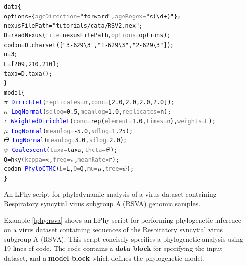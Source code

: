 \documentclass[12pt]{article} %
\begin{document}
{
  \small
  \begin{listing}
    \begin{alltt}
    data \{
      options = \{\textcolor{gray}{ageDirection=}\textcolor{constant}{"forward"}, \textcolor{gray}{ageRegex=}\textcolor{constant}{"s(\textbackslash{}d+)"}\};
      nexusFilePath = \textcolor{constant}{"tutorials/data/RSV2.nex"};
      D = \textcolor{generator}{readNexus}(\textcolor{gray}{file=}nexusFilePath, \textcolor{gray}{options=}options);
      codon = D.\textcolor{generator}{charset}([\textcolor{constant}{"3-629\textbackslash{}3"}, \textcolor{constant}{"1-629\textbackslash{}3"}, \textcolor{constant}{"2-629\textbackslash{}3"}]);
      n = 3;
      L = [209, 210, 210];
      taxa = D.\textcolor{generator}{taxa}();
    \}
    model \{
      \textcolor{bluishgreen}{\(\pi\)} ~ \textcolor{blue}{Dirichlet}(\textcolor{gray}{replicates=}n, \textcolor{gray}{conc=}[\textcolor{constant}{2.0}, \textcolor{constant}{2.0}, \textcolor{constant}{2.0}, \textcolor{constant}{2.0}]);
      \textcolor{bluishgreen}{\(\kappa\)} ~ \textcolor{blue}{LogNormal}(\textcolor{gray}{sdlog=}\textcolor{constant}{0.5}, \textcolor{gray}{meanlog=}\textcolor{constant}{1.0}, \textcolor{gray}{replicates=}n);
      \textcolor{bluishgreen}{r} ~ \textcolor{blue}{WeightedDirichlet}(\textcolor{gray}{conc=}\textcolor{generator}{rep}(\textcolor{gray}{element=}\textcolor{constant}{1.0}, \textcolor{gray}{times=}n), \textcolor{gray}{weights=}L);
      \textcolor{bluishgreen}{\(\mu\)} ~ \textcolor{blue}{LogNormal}(\textcolor{gray}{meanlog=}\textcolor{constant}{-5.0}, \textcolor{gray}{sdlog=}\textcolor{constant}{1.25});
      \textcolor{bluishgreen}{\(\Theta\)} ~ \textcolor{blue}{LogNormal}(\textcolor{gray}{meanlog=}\textcolor{constant}{3.0}, \textcolor{gray}{sdlog=}\textcolor{constant}{2.0});
      \textcolor{bluishgreen}{\(\psi\)} ~ \textcolor{blue}{Coalescent}(\textcolor{gray}{taxa=}taxa, \textcolor{gray}{theta=}\textcolor{bluishgreen}{\(\Theta\)});
      Q = \textcolor{generator}{hky}(\textcolor{gray}{kappa=}\textcolor{bluishgreen}{\(\kappa\)}, \textcolor{gray}{freq=}\textcolor{bluishgreen}{\(\pi\)}, \textcolor{gray}{meanRate=}\textcolor{bluishgreen}{r});
      \textcolor{bluishgreen}{codon} ~ \textcolor{blue}{PhyloCTMC}(\textcolor{gray}{L=}L, \textcolor{gray}{Q=}Q, \textcolor{gray}{mu=}\textcolor{bluishgreen}{\(\mu\)}, \textcolor{gray}{tree=}\textcolor{bluishgreen}{\(\psi\)});
    \}
    \end{alltt}
    \caption{An LPhy script for phylodynamic analysis of a virus dataset containing Respiratory syncytial virus subgroup A (RSVA) genomic samples.
    \newline}
    \label{lphy:rsva}
    \end{listing}
}
Example \ref{lphy:rsva} shows an LPhy script for performing phylogenetic inference on a virus dataset containing sequences of the Respiratory syncytial virus subgroup A (RSVA). 
This script concisely specifies a phylogenetic analysis using 19 lines of code.  
The code contains a \textbf{data block} for specifying the input dataset, and a \textbf{model block} which defines the phylogenetic model. 
\end{document}
